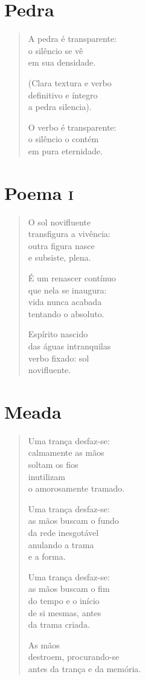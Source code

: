 \chapter{Pedra}

\begin{verse}
A pedra é transparente:\\
o silêncio se vê\\
em sua densidade.

(Clara textura e verbo\\
definitivo e íntegro\\
a pedra silencia).

O verbo é transparente:\\
o silêncio o contém\\
em pura eternidade.
\end{verse}

\chapter{Poema \textsc{i}}

\begin{verse}
O sol novifluente\\
transfigura a vivência:\\
outra figura nasce\\
e subsiste, plena.

É um renascer contínuo\\
que nela se inaugura:\\
vida nunca acabada\\
tentando o absoluto.

Espírito nascido\\
das águas intranquilas\\
verbo fixado: sol\\
novifluente.
\end{verse}

\chapter{Meada}

\begin{verse}
Uma trança desfaz-se:\\
calmamente as mãos\\
soltam os fios\\
inutilizam\\
o amorosamente tramado.

Uma trança desfaz-se:\\
as mãos buscam o fundo\\
da rede inesgotável\\
anulando a trama\\
e a forma.

Uma trança desfaz-se:\\
as mãos buscam o fim\\
do tempo e o início\\
de si mesmas, antes\\
da trama criada.

As mãos\\
destroem, procurando-se\\
antes da trança e da memória.
\end{verse}

